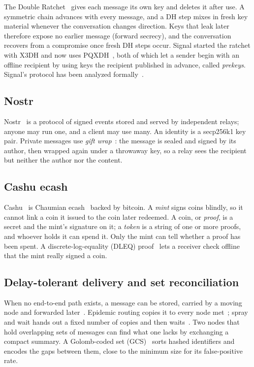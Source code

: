 \documentclass[conference]{IEEEtran}
\begin{document}
The Double Ratchet~\cite{doubleratchet} gives each message its own key and deletes it after use. A symmetric chain advances with every message, and a DH step mixes in fresh key material whenever the conversation changes direction. Keys that leak later therefore expose no earlier message (forward secrecy), and the conversation recovers from a compromise once fresh DH steps occur. Signal started the ratchet with X3DH and now uses PQXDH~\cite{x3dh,pqxdh}, both of which let a sender begin with an offline recipient by using keys the recipient published in advance, called \emph{prekeys}. Signal's protocol has been analyzed formally~\cite{cohngordon2017}.

\subsection{Nostr}
Nostr~\cite{nip01} is a protocol of signed events stored and served by independent relays; anyone may run one, and a client may use many. An identity is a secp256k1 key pair. Private messages use \emph{gift wrap}~\cite{nip17,nip59}: the message is sealed and signed by its author, then wrapped again under a throwaway key, so a relay sees the recipient but neither the author nor the content.

\subsection{Cashu ecash}
Cashu~\cite{nut00} is Chaumian ecash~\cite{chaum1983} backed by bitcoin. A \emph{mint} signs coins blindly, so it cannot link a coin it issued to the coin later redeemed. A coin, or \emph{proof}, is a secret and the mint's signature on it; a \emph{token} is a string of one or more proofs, and whoever holds it can spend it. Only the mint can tell whether a proof has been spent. A discrete-log-equality (DLEQ) proof~\cite{nut12} lets a receiver check offline that the mint really signed a coin.

\subsection{Delay-tolerant delivery and set reconciliation}
When no end-to-end path exists, a message can be stored, carried by a moving node and forwarded later~\cite{fall2003,rfc4838}. Epidemic routing copies it to every node met~\cite{vahdat2000}; spray and wait hands out a fixed number of copies and then waits~\cite{spyropoulos2005}. Two nodes that hold overlapping sets of messages can find what one lacks by exchanging a compact summary. A Golomb-coded set (GCS)~\cite{putze2007,golomb1966} sorts hashed identifiers and encodes the gaps between them, close to the minimum size for its false-positive rate.
\end{document}
